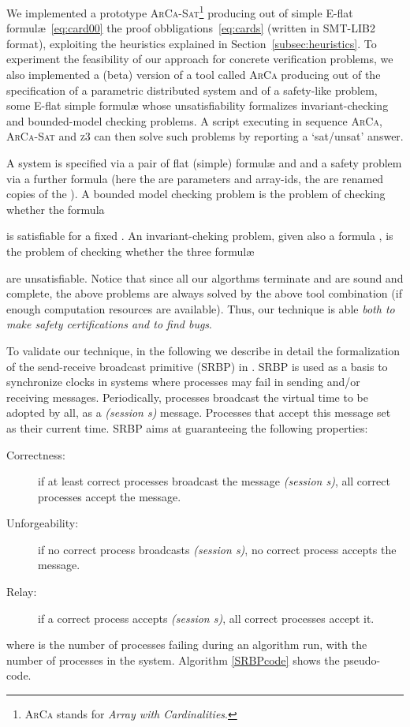 \documentclass[11pt,a4paper]{article}
\newcommand{\formulae}{formul\ae\xspace}
\begin{document}
{We implemented a prototype \textsc{ArCa-Sat}\footnote{\textsc{ArCa} stands for \emph{Array with Cardinalities}.} producing out of  simple E-flat \formulae~\eqref{eq:card00} the  proof obbligations~\eqref{eq:cards} (written  in SMT-LIB2 format), exploiting the heuristics 
explained in Section~\ref{subsec:heuristics}. To experiment the feasibility of our approach for concrete verification problems, we also implemented a (beta) version of a tool called \textsc{ArCa} producing out of the
specification of a parametric distributed system and of a safety-like problem, some E-flat simple \formulae whose unsatisfiability formalizes invariant-checking and bounded-model checking problems. A script executing in sequence 
\textsc{ArCa},  \textsc{ArCa-Sat} and \textsc{z3} can then solve such problems by reporting a `sat/unsat' answer.

A system is specified via a pair of flat (simple) \formulae  and 
and a safety problem via a further formula  (here the  are parameters and array-ids, the  are renamed copies of the ).
A bounded model checking problem is the problem of checking whether the formula

is satisfiable for a fixed . An invariant-cheking problem, given also a formula , is the problem of checking whether the three \formulae

are unsatisfiable. Notice that since all our algorthms terminate and are sound and complete, the above  problems are always solved by the above tool combination (if enough
computation resources are available). Thus, our technique is able \emph{both to make safety certifications and to find bugs}.

To validate our technique, in the following we describe in detail the formalization of the send-receive broadcast primitive (SRBP) in \cite{Srikanth87}.  SRBP  is used as a basis to synchronize clocks in systems where  processes may fail in sending and/or receiving messages.  Periodically, processes broadcast the virtual time to be adopted by all, as a \textit{(session s)} message.  Processes that accept this message set  as their current time.  SRBP aims at guaranteeing the following properties:
\begin{description}
\item [Correctness:] if at least  correct processes broadcast the message \textit{(session s)}, all correct processes accept the message.
\item [Unforgeability:] if no correct process broadcasts \textit{(session s)}, no correct process accepts the message.
\item [Relay:] if a correct process accepts \textit{(session s)}, all correct processes accept it.
\end{description}
where  is the number of processes failing during an algorithm run, with  the number of processes in the system.  Algorithm \ref{SRBPcode} shows the pseudo-code.

}
\end{document}
